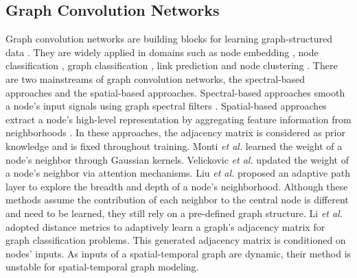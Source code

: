 \subsection{Graph Convolution Networks}
Graph convolution networks are building blocks for learning graph-structured data \cite{wu2019comprehensive}. They are widely applied in domains such as node embedding \cite{pan2019learning}, node classification \cite{kipf2016semi}, graph classification \cite{ying2018hierarchical}, link prediction \cite{zhang2018link} and node clustering \cite{wang2017mgae}.  There are two mainstreams of graph convolution networks, the spectral-based approaches and the spatial-based approaches. Spectral-based approaches smooth a node's input signals using graph spectral filters \cite{bruna2013spectral,defferrard2016convolutional,kipf2016semi}. 
Spatial-based approaches extract a node's high-level representation by aggregating feature information from neighborhoods \cite{atwood2016diffusion,gilmer2017neural,hamilton2017inductive}. In these approaches, the adjacency matrix is considered as prior knowledge and is fixed throughout training. Monti \emph{et al.}  learned the weight of a node's neighbor through Gaussian kernels. Velickovic \emph{et al.}  updated the weight of a node's neighbor via attention mechanisms.  Liu \emph{et al.}  proposed an adaptive path layer to explore the breadth and depth of a node's neighborhood. Although these methods assume the contribution of each neighbor to the central node is different and need to be learned, they still rely on a pre-defined graph structure.  Li \emph{et al.}  adopted distance metrics to adaptively learn a graph's adjacency matrix for graph classification problems. This generated adjacency matrix is conditioned on nodes' inputs. As inputs of a spatial-temporal graph are dynamic, their method is unstable for spatial-temporal graph modeling.



